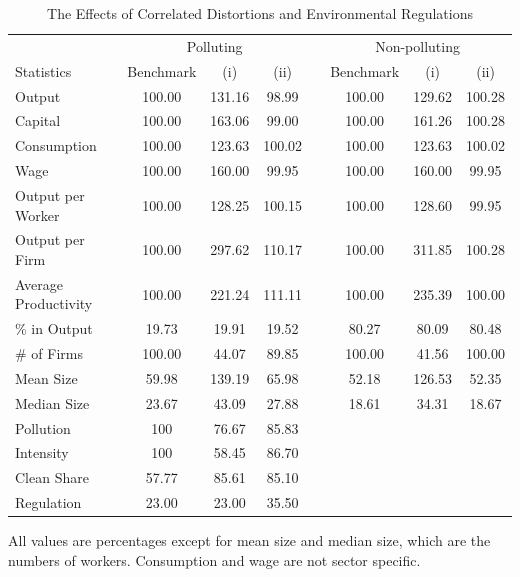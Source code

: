 \documentclass[AEJ]{AEA}
\begin{document}
\begin{table}[t]
\footnotesize
\centering
\caption{The Effects of Correlated Distortions and Environmental Regulations}
\begin{tabular}{lccccccc}
    \hline \hline
                         & \multicolumn{3}{c}{Polluting}    & & \multicolumn{3}{c}{Non-polluting} \\
    \cmidrule{2-4} \cmidrule{6-8}
    Statistics           & Benchmark & (i)      & (ii)      & & Benchmark     & (i)    & (ii) \\
    \hline
    Output               & 100.00    & 131.16   & 98.99     & & 100.00        & 129.62 & 100.28 \\
    Capital              & 100.00    & 163.06   & 99.00     & & 100.00        & 161.26 & 100.28 \\
    Consumption          & 100.00    & 123.63   & 100.02    & & 100.00        & 123.63 & 100.02 \\
    Wage                 & 100.00    & 160.00   & 99.95     & & 100.00        & 160.00 &  99.95 \\
    Output per Worker    & 100.00    & 128.25   & 100.15    & & 100.00        & 128.60 &  99.95 \\
    Output per Firm      & 100.00    & 297.62   & 110.17    & & 100.00        & 311.85 & 100.28 \\
    Average Productivity & 100.00    & 221.24   & 111.11    & & 100.00        & 235.39 & 100.00 \\
    \% in Output         & 19.73     & 19.91    & 19.52     & &  80.27        & 80.09  &  80.48 \\
    \hline
    \# of Firms          & 100.00    & 44.07    & 89.85     & & 100.00        & 41.56  & 100.00 \\
    Mean Size            & 59.98     & 139.19   & 65.98     & & 52.18         & 126.53 &  52.35 \\
    Median Size          & 23.67     & 43.09    & 27.88     & & 18.61         & 34.31  & 18.67  \\
    \hline
    Pollution            & 100       & 76.67    & 85.83    \\
    Intensity            & 100       & 58.45    & 86.70    \\
    Clean Share          & 57.77     & 85.61    & 85.10     \\
    Regulation           & 23.00     & 23.00    & 35.50     \\
    \hline
\end{tabular}
\begin{tablenotes}
     All values are percentages except for mean size and median size, which are the numbers of workers. Consumption and wage are not sector specific.
\end{tablenotes}
\label{tab:aggregates}
\end{table}
\end{document}
